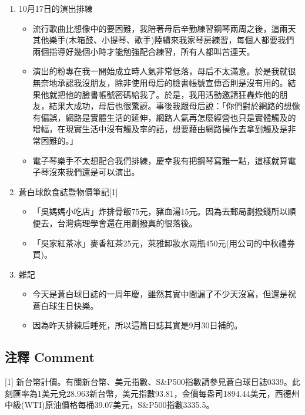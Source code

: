 \documentclass[a5paper, 11pt
]{book}
\providecommand{\tightlist}{%
  \setlength{\itemsep}{0pt}\setlength{\parskip}{0pt}}
\begin{document}
\begin{enumerate}
\def\labelenumi{\arabic{enumi}.}
\item
  10月17日的演出排練

  \begin{itemize}
  \tightlist
  \item
    流行歌曲比想像中的要困難，我陪著母后辛勤練習鋼琴兩周之後，這兩天其他樂手(木箱鼓、小提琴、歌手)陸續來我家琴房練習，每個人都要我們兩個指導好幾個小時才能勉強配合練習，所有人都叫苦連天。
  \item
    演出的粉專在我一開始成立時人氣非常低落，母后不太滿意。於是我就很無奈地承認我沒朋友，除非使用母后的臉書帳號宣傳否則是沒有用的。結果他就把他的臉書帳號密碼給我了。於是，我用活動邀請狂轟炸他的朋友，結果大成功，母后也很驚訝。事後我跟母后說：「你們對於網路的想像有偏誤，網路是實體生活的延伸，網路人氣再怎麼經營也只是實體觸及的增幅，在現實生活中沒有觸及率的話，想要藉由網路操作去拿到觸及是非常困難的。」
  \item
    電子琴樂手不太想配合我們排練，慶幸我有把鋼琴寫難一點，這樣就算電子琴沒來我們還是可以演出。
  \end{itemize}
\item
  蒼白球飲食誌暨物價筆記{[}1{]}

  \begin{itemize}
  \tightlist
  \item
    「吳媽媽小吃店」炸排骨飯75元，豬血湯15元。因為去郵局劃撥錢所以順便去，台灣病理學會還在用劃撥真的很落後。
  \item
    「吳家紅茶冰」麥香紅茶25元，萊雅卸妝水兩瓶450元(用公司的中秋禮券買)。
  \end{itemize}
\item
  雜記

  \begin{itemize}
  \tightlist
  \item
    今天是蒼白球日誌的一周年慶，雖然其實中間漏了不少天沒寫，但還是祝蒼白球生日快樂。
  \item
    因為昨天排練后睡死，所以這篇日誌其實是9月30日補的。
  \end{itemize}
\end{enumerate}

\hypertarget{ux6ce8ux91cb-comment-27}{%
\subsection{注釋 Comment}\label{ux6ce8ux91cb-comment-27}}

{[}1{]}
新台幣計價。有關新台幣、美元指數、S\&P500指數請參見蒼白球日誌0339。此刻匯率為1美元兌28.963新台幣，美元指數93.81，金價每盎司1894.44美元，西德州中級(WTI)原油價格每桶39.07美元，S\&P500指數3335.5。
\end{document}
